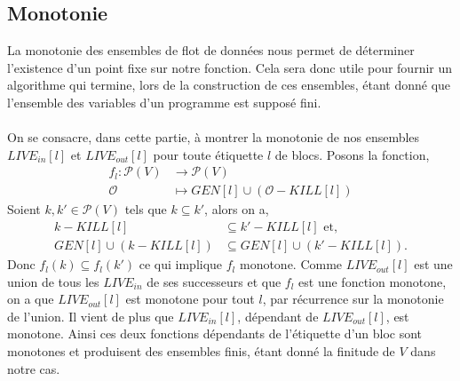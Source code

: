 \subsection{Monotonie}
La monotonie des ensembles de flot de données nous permet de déterminer l'existence d'un point fixe sur notre
fonction. Cela sera donc utile pour fournir un algorithme qui termine, lors de la construction de ces ensembles, 
étant donné que l'ensemble des variables d'un programme est supposé fini.
\\
\\
On se consacre, dans cette partie, à montrer la monotonie de nos ensembles $LIVE_{in}[l]$ et $LIVE_{out}[l]$
pour toute étiquette $l$ de blocs. Posons la fonction,
\begin{align*}
	f_l : \mathcal{P}(V) &\longrightarrow \mathcal{P}(V) \\
	\mathcal{O} &\longmapsto GEN[l] \cup (\mathcal{O} - KILL[l])
\end{align*}
Soient $k, k' \in \mathcal{P}(V)$ tels que $k \subseteq k'$, alors on a,
\begin{align*}
	k - KILL[l] &\subseteq k' - KILL[l] \text{ et,}\\
	GEN[l] \cup (k - KILL[l]) &\subseteq GEN[l] \cup (k' - KILL[l]).
\end{align*}
Donc $f_l(k) \subseteq f_l(k')$ ce qui implique $f_l$ monotone. Comme $LIVE_{out}[l]$ est une union de tous les $LIVE_{in}$
de ses successeurs et que $f_l$ est une fonction monotone, on a que $LIVE_{out}[l]$ est monotone pour tout $l$, par récurrence
sur la monotonie de l'union. Il vient de plus que $LIVE_{in}[l]$, dépendant de $LIVE_{out}[l]$, est monotone.
Ainsi ces deux fonctions dépendants de l'étiquette d'un bloc sont monotones et produisent des ensembles finis, étant donné
la finitude de $V$ dans notre cas.